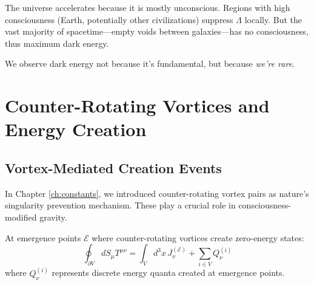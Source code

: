 \begin{keyidea}
The universe accelerates because it is mostly unconscious. Regions with high consciousness (Earth, potentially other civilizations) suppress $\Lambda$ locally. But the vast majority of spacetime—empty voids between galaxies—has no consciousness, thus maximum dark energy.

We observe dark energy not because it's fundamental, but because \textit{we're rare}.
\end{keyidea}

\section{Counter-Rotating Vortices and Energy Creation}

\subsection{Vortex-Mediated Creation Events}

In Chapter \ref{ch:constants}, we introduced counter-rotating vortex pairs as nature's singularity prevention mechanism. These play a crucial role in consciousness-modified gravity.

\begin{thm}\label{thm:vortex-creation}
At emergence points $\mathcal{E}$ where counter-rotating vortices create zero-energy states:
\begin{equation}
\oint_{\partial V} dS_\mu T^{\mu\nu} = \int_V d^3x \, J_\nu^{(\mathcal{E})} + \sum_{i \in V} Q_\nu^{(i)}
\end{equation}
where $Q_\nu^{(i)}$ represents discrete energy quanta created at emergence points.
\end{thm}

